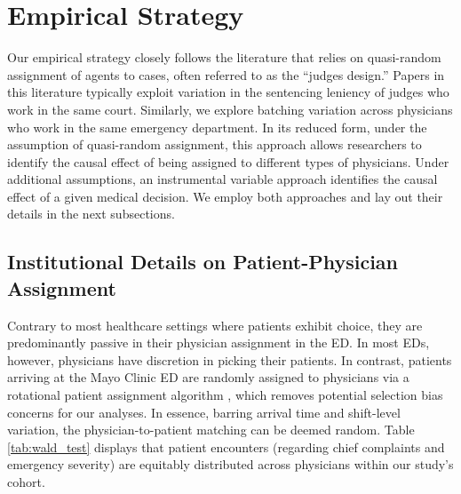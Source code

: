 \documentclass[,,nonblindrev]{informs}
\begin{document}
\hypertarget{sec:3}{%
\section{Empirical Strategy}\label{sec:3}}

Our empirical strategy closely follows the literature that relies on
quasi-random assignment of agents to cases, often referred to as the
``judges design.'' Papers in this literature typically exploit variation
in the sentencing leniency of judges who work in the same court.
Similarly, we explore batching variation across physicians who work in
the same emergency department. In its reduced form, under the assumption
of quasi-random assignment, this approach allows researchers to identify
the causal effect of being assigned to different types of physicians.
Under additional assumptions, an instrumental variable approach
identifies the causal effect of a given medical decision. We employ both
approaches and lay out their details in the next subsections.

\hypertarget{institutional-details-on-patient-physician-assignment}{%
\subsection{Institutional Details on Patient-Physician
Assignment}\label{institutional-details-on-patient-physician-assignment}}

Contrary to most healthcare settings where patients exhibit choice, they
are predominantly passive in their physician assignment in the ED. In
most EDs, however, physicians have discretion in picking their patients.
In contrast, patients arriving at the Mayo Clinic ED are randomly
assigned to physicians via a rotational patient assignment algorithm
\citet{traub2016emergency}, which removes potential selection bias
concerns for our analyses. In essence, barring arrival time and
shift-level variation, the physician-to-patient matching can be deemed
random. Table \ref{tab:wald_test} displays that patient encounters
(regarding chief complaints and emergency severity) are equitably
distributed across physicians within our study's cohort.
\end{document}
